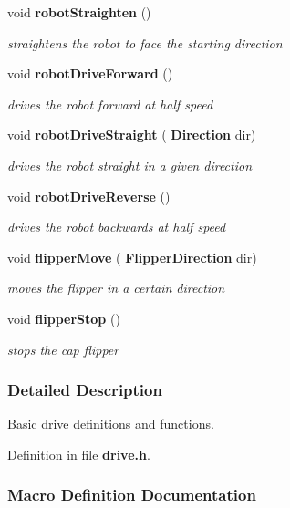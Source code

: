 \begin{DoxyCompactItemize}
void \textbf{ robot\+Straighten} ()
\begin{DoxyCompactList}\small\item\em straightens the robot to face the starting direction \end{DoxyCompactList}\item 
void \textbf{ robot\+Drive\+Forward} ()
\begin{DoxyCompactList}\small\item\em drives the robot forward at half speed \end{DoxyCompactList}\item 
void \textbf{ robot\+Drive\+Straight} (\textbf{ Direction} dir)
\begin{DoxyCompactList}\small\item\em drives the robot straight in a given direction \end{DoxyCompactList}\item 
void \textbf{ robot\+Drive\+Reverse} ()
\begin{DoxyCompactList}\small\item\em drives the robot backwards at half speed \end{DoxyCompactList}\item 
void \textbf{ flipper\+Move} (\textbf{ Flipper\+Direction} dir)
\begin{DoxyCompactList}\small\item\em moves the flipper in a certain direction \end{DoxyCompactList}\item 
void \textbf{ flipper\+Stop} ()
\begin{DoxyCompactList}\small\item\em stops the cap flipper \end{DoxyCompactList}\end{DoxyCompactItemize}


\subsubsection{Detailed Description}
Basic drive definitions and functions. 



Definition in file \textbf{ drive.\+h}.



\subsubsection{Macro Definition Documentation}
\mbox{\label{drive_8h_a4679d8ea8690999a6c6c7c0cb245c879}} 
